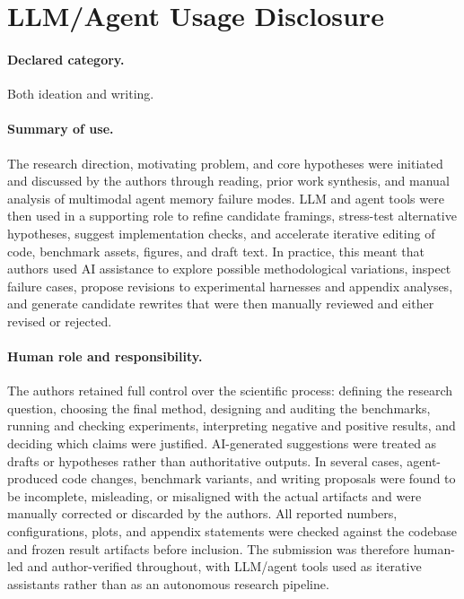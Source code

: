 \documentclass{article}
\begin{document}
\section*{LLM/Agent Usage Disclosure}

\paragraph{Declared category.}
Both ideation and writing.

\paragraph{Summary of use.}
The research direction, motivating problem, and core hypotheses were initiated and discussed by the authors through reading, prior work synthesis, and manual analysis of multimodal agent memory failure modes. LLM and agent tools were then used in a supporting role to refine candidate framings, stress-test alternative hypotheses, suggest implementation checks, and accelerate iterative editing of code, benchmark assets, figures, and draft text. In practice, this meant that authors used AI assistance to explore possible methodological variations, inspect failure cases, propose revisions to experimental harnesses and appendix analyses, and generate candidate rewrites that were then manually reviewed and either revised or rejected.

\paragraph{Human role and responsibility.}
The authors retained full control over the scientific process: defining the research question, choosing the final method, designing and auditing the benchmarks, running and checking experiments, interpreting negative and positive results, and deciding which claims were justified. AI-generated suggestions were treated as drafts or hypotheses rather than authoritative outputs. In several cases, agent-produced code changes, benchmark variants, and writing proposals were found to be incomplete, misleading, or misaligned with the actual artifacts and were manually corrected or discarded by the authors. All reported numbers, configurations, plots, and appendix statements were checked against the codebase and frozen result artifacts before inclusion. The submission was therefore human-led and author-verified throughout, with LLM/agent tools used as iterative assistants rather than as an autonomous research pipeline.
\end{document}
